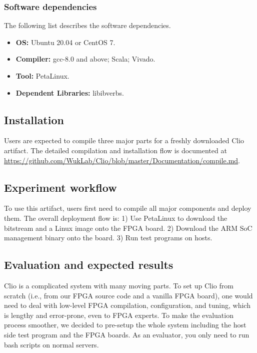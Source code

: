 \subsubsection{Software dependencies}
The following list describes the software dependencies.
{\small
\begin{itemize}
  \item{\bf OS: }Ubuntu 20.04 or CentOS 7.
  \item{\bf Compiler: }gcc-8.0 and above; Scala; Vivado.
  \item{\bf Tool: }PetaLinux.
  \item{\bf Dependent Libraries: }libibverbs.
\end{itemize}
}

\subsection{Installation}
Users are expected to compile three major parts for a freshly downloaded Clio artifact. The detailed compilation and installation flow is documented at \url{https://github.com/WukLab/Clio/blob/master/Documentation/compile.md}.

\subsection{Experiment workflow}
To use this artifact, users first need to compile all major components and deploy them. The overall deployment flow is:
1) Use PetaLinux to download the bitstream and a Linux image onto the FPGA board. 2) Download the ARM SoC management binary onto the board. 3) Run test programs on hosts.

\subsection{Evaluation and expected results}

Clio is a complicated system with many moving parts. To set up Clio from scratch (i.e., from our FPGA source code and a vanilla FPGA board), one would need to deal with low-level FPGA compilation, configuration, and tuning, which is lengthy and error-prone, even to FPGA experts. To make the evaluation process smoother, we decided to pre-setup the whole system including the host side test program and the FPGA boards. As an evaluator, you only need to run bash scripts on normal servers.

